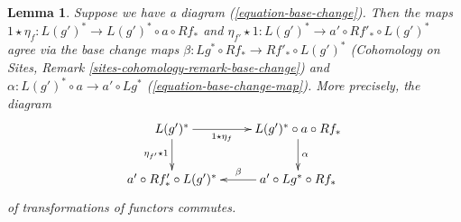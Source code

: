\documentclass{stacks-project}
\theoremstyle{plain}
\newtheorem{lemma}[subsection]{Lemma}
\theoremstyle{definition}
\theoremstyle{remark}
\numberwithin{equation}{subsection}
\begin{document}
\begin{lemma}
\label{lemma-unit-and-base-change}
Suppose we have a diagram (\ref{equation-base-change}). Then the maps
$1 \star \eta_f : L(g')^* \to L(g')^* \circ a \circ Rf_*$ and
$\eta_{f'} \star 1 : L(g')^* \to a' \circ Rf'_* \circ L(g')^*$
agree via the base change maps
$\beta : Lg^* \circ Rf_* \to Rf'_* \circ L(g')^*$
(Cohomology on Sites, Remark \ref{sites-cohomology-remark-base-change})
and $\alpha : L(g')^* \circ a \to a' \circ Lg^*$
(\ref{equation-base-change-map}).
More precisely, the diagram
$$
\xymatrix{
L(g')^* \ar[r]_-{1 \star \eta_f} \ar[d]_{\eta_{f'} \star 1} &
L(g')^* \circ a \circ Rf_* \ar[d]^\alpha \\
a' \circ Rf'_* \circ L(g')^* &
a' \circ Lg^* \circ Rf_* \ar[l]_-\beta
}
$$
of transformations of functors commutes.
\end{lemma}
\end{document}
